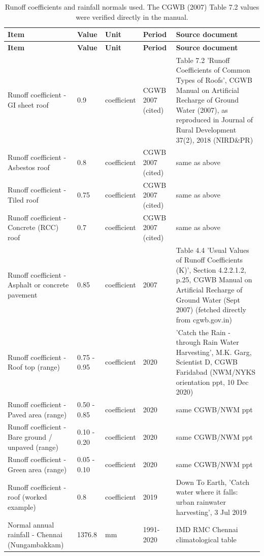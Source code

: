 {\scriptsize\setlength{\tabcolsep}{3pt}
\begin{longtable}{p{4.8cm} p{2.3cm} p{1.4cm} p{2.1cm} p{5.2cm}}
\caption{Runoff coefficients and rainfall normals used. The CGWB (2007) Table 7.2 values were verified directly in the manual.}\label{tab:refinputs}\\
\toprule
\textbf{Item} & \textbf{Value} & \textbf{Unit} & \textbf{Period} & \textbf{Source document}\\ \midrule\endfirsthead
\toprule \textbf{Item} & \textbf{Value} & \textbf{Unit} & \textbf{Period} & \textbf{Source document}\\ \midrule\endhead
\bottomrule\endfoot
Runoff coefficient - GI sheet roof & 0.9 & coefficient & CGWB 2007 (cited) & Table 7.2 'Runoff Coefficients of Common Types of Roofs', CGWB Manual on Artificial Recharge of Ground Water (2007), as reproduced in Journal of Rural Development 37(2), 2018 (NIRD\&PR)\\
Runoff coefficient - Asbestos roof & 0.8 & coefficient & CGWB 2007 (cited) & same as above\\
Runoff coefficient - Tiled roof & 0.75 & coefficient & CGWB 2007 (cited) & same as above\\
Runoff coefficient - Concrete (RCC) roof & 0.7 & coefficient & CGWB 2007 (cited) & same as above\\
Runoff coefficient - Asphalt or concrete pavement & 0.85 & coefficient & 2007 & Table 4.4 'Usual Values of Runoff Coefficients (K)', Section 4.2.2.1.2, p.25, CGWB Manual on Artificial Recharge of Ground Water (Sept 2007) (fetched directly from cgwb.gov.in)\\
Runoff coefficient - Roof top (range) & 0.75 - 0.95 & coefficient & 2020 & 'Catch the Rain - through Rain Water Harvesting', M.K. Garg, Scientist D, CGWB Faridabad (NWM/NYKS orientation ppt, 10 Dec 2020)\\
Runoff coefficient - Paved area (range) & 0.50 - 0.85 & coefficient & 2020 & same CGWB/NWM ppt\\
Runoff coefficient - Bare ground / unpaved (range) & 0.10 - 0.20 & coefficient & 2020 & same CGWB/NWM ppt\\
Runoff coefficient - Green area (range) & 0.05 - 0.10 & coefficient & 2020 & same CGWB/NWM ppt\\
Runoff coefficient - roof (worked example) & 0.8 & coefficient & 2019 & Down To Earth, 'Catch water where it falls: urban rainwater harvesting', 3 Jul 2019\\
Normal annual rainfall - Chennai (Nungambakkam) & 1376.8 & mm & 1991-2020 & IMD RMC Chennai climatological table\\

\end{longtable}}

